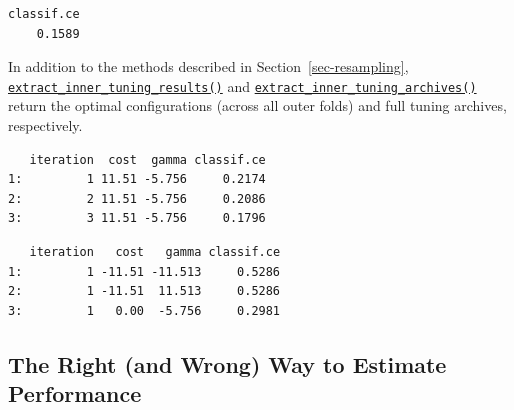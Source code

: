 \begin{Shaded}
\begin{Highlighting}[]
\SpecialCharTok{$}\NormalTok{()}
\end{Highlighting}
\end{Shaded}

\begin{verbatim}
classif.ce 
    0.1589 
\end{verbatim}

In addition to the methods described in Section~\ref{sec-resampling},
\href{https://mlr3tuning.mlr-org.com/reference/extract_inner_tuning_results.html}{\texttt{extract\_inner\_tuning\_results()}}
and
\href{https://mlr3tuning.mlr-org.com/reference/extract_inner_tuning_archives.html}{\texttt{extract\_inner\_tuning\_archives()}}
return the optimal configurations (across all outer folds) and full
tuning archives, respectively.

\begin{Shaded}
\begin{Highlighting}[]
\NormalTok{(rr)[,}
\NormalTok{  .(iteration, cost, gamma, classif.ce)]}
\end{Highlighting}
\end{Shaded}

\begin{verbatim}
   iteration  cost  gamma classif.ce
1:         1 11.51 -5.756     0.2174
2:         2 11.51 -5.756     0.2086
3:         3 11.51 -5.756     0.1796
\end{verbatim}

\begin{Shaded}
\begin{Highlighting}[]
\NormalTok{(rr)[}\SpecialCharTok{:}\NormalTok{,}
\NormalTok{  .(iteration, cost, gamma, classif.ce)]}
\end{Highlighting}
\end{Shaded}

\begin{verbatim}
   iteration   cost   gamma classif.ce
1:         1 -11.51 -11.513     0.5286
2:         1 -11.51  11.513     0.5286
3:         1   0.00  -5.756     0.2981
\end{verbatim}

\hypertarget{sec-resample-overfitting}{%
\subsection{The Right (and Wrong) Way to Estimate
Performance}\label{sec-resample-overfitting}}

